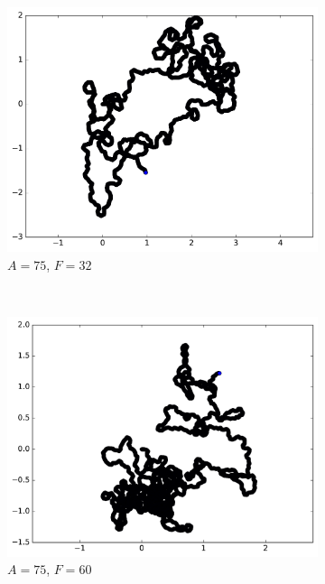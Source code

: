 \begin{appendices}
\begin{figure}[htbp]
		~
		\begin{subfigure}[t]{\subImgWmo}
			\centering
			\includegraphics[width=\textwidth]{figures/ch3/synTraj_219_75_32}
			\caption[$A = 75$, $F=32$]{$A = 75$, $F=32$}
			\label{fig:synTraj_219_75_32}
		\end{subfigure}
		~
		\begin{subfigure}[t]{\subImgWmo}
			\centering
			\includegraphics[width=\textwidth]{figures/ch3/synTraj_219_75_60}
			\caption[$A = 75$, $F=60$]{$A = 75$, $F=60$}
			\label{fig:synTraj_219_75_60}
		\end{subfigure}
		~
		\begin{subfigure}[t]{\subImgWmo}

\end{subfigure}
\end{figure}
\end{appendices}
